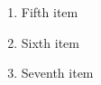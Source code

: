 \documentclass{article}
\begin{document}
\begin{enumerate}[start=5]
\item Fifth item
\item Sixth item
\item Seventh item
\end{enumerate}
\end{document}
